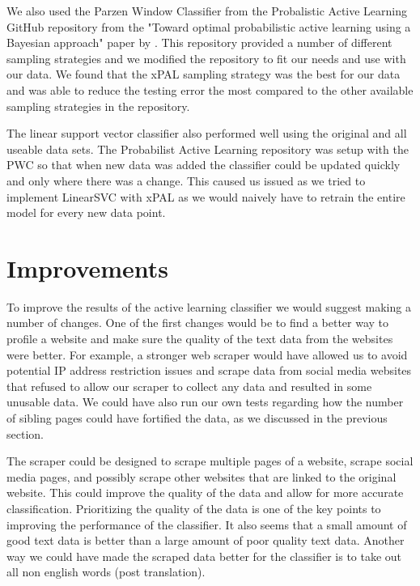We also used the Parzen Window Classifier from the Probalistic Active Learning GitHub repository from the "Toward optimal probabilistic active learning using a Bayesian approach" paper by \cite{kottke2021toward}. This repository provided a number of different sampling strategies and we modified the repository to fit our needs and use with our data. We found that the xPAL sampling strategy was the best for our data and was able to reduce the testing error the most compared to the other available sampling strategies in the repository.

The linear support vector classifier also performed well using the original and all useable data sets. The Probabilist Active Learning repository was setup with the PWC so that when new data was added the classifier could be updated quickly and only where there was a change. This caused us issued as we tried to implement LinearSVC with xPAL as we would naively have to retrain the entire model for every new data point. 

\section*{Improvements}

To improve the results of the active learning classifier we would suggest making a number of changes. One of the first changes would be to find a better way to profile a website and make sure the quality of the text data from the websites were better. For example, a stronger web scraper would have allowed us to avoid potential IP address restriction issues and scrape data from social media websites that refused to allow our scraper to collect any data and resulted in some unusable data. We could have also run our own tests regarding how the number of sibling pages could have fortified the data, as we discussed in the previous section.

The scraper could be designed to scrape multiple pages of a website, scrape social media pages, and possibly scrape other websites that are linked to the original website. This could improve the quality of the data and allow for more accurate classification. Prioritizing the quality of the data is one of the key points to improving the performance of the classifier. It also seems that a small amount of good text data is better than a large amount of poor quality text data. Another way we could have made the scraped data better for the classifier is to take out all non english words (post translation).


